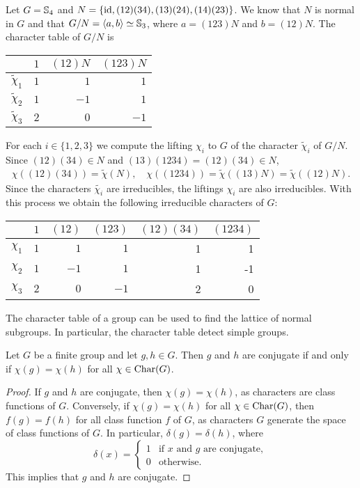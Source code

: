 \begin{example}
    Let $G=\mathbb{S}_4$ and $N=\{\operatorname{id},(12)(34),(13)(24),(14)(23)\}$. We know that $N$ is normal in $G$ 
    and that $G/N=\langle a,b\rangle\simeq\mathbb{S}_3$, where 
    $a=(123)N$ and $b=(12)N$. 
    The character table of $G/N$ is 
    \begin{center}
		\begin{tabular}{|c|rrr|}
			\hline
			& $1$ & $(12)N$ & $(123)N$ \tabularnewline
			\hline 
			$\widetilde{\chi}_{1}$ & $1$ & $1$ & $1$\tabularnewline
			$\widetilde{\chi}_{2}$ & $1$ & $-1$ & $1$ \tabularnewline
			$\widetilde{\chi}_{3}$ & $2$ & $0$ & $-1$ \tabularnewline
			\hline
		\end{tabular}
	\end{center}
    For each $i\in\{1,2,3\}$ we compute the lifting $\chi_i$ to $G$ of the character  
    $\widetilde{\chi}_i$ of $G/N$. 
    Since $(12)(34)\in N$ and $(13)(1234)=(12)(34)\in N$, 
    \begin{align*}
        \chi( (12)(34) )=\widetilde{\chi}(N),\quad
        \chi( (1234) )=\widetilde{\chi}((13)N)=\widetilde{\chi}((12)N).
    \end{align*}
    Since the characters $\widetilde{\chi_i}$ are irreducibles, 
    the liftings $\chi_i$ are also irreducibles. With this process
    we obtain the following irreducible characters of $G$:
    	\begin{center}
		\begin{tabular}{|c|rrrrr|}
			\hline
			& $1$ & $(12)$ & $(123)$ & $(12)(34)$ & $(1234)$ \tabularnewline
			\hline 
			$\chi_{1}$ & $1$ & $1$ & $1$ & 1 & 1\tabularnewline
			$\chi_{2}$ & $1$ & $-1$ & $1$ & 1 & -1 \tabularnewline
			$\chi_{3}$ & $2$ & $0$ & $-1$ & 2 & 0\tabularnewline
			\hline
		\end{tabular}
	\end{center}
\end{example}

The character table of a group can be used to find the lattice 
of normal subgroups. In particular, the character table detect simple groups. 

\begin{lemma}
    Let $G$ be a finite group and 
    let $g,h\in G$. Then $g$ and $h$ 
    are conjugate if and only if 
    $\chi(g)=\chi(h)$ for all
    $\chi\in\operatorname{Char}(G)$. 
\end{lemma}

\begin{proof}
    If $g$ and $h$ are conjugate, then $\chi(g)=\chi(h)$, as characters are class functions
    of $G$.
    Conversely, if $\chi(g)=\chi(h)$ for all $\chi\in\operatorname{Char}(G)$, then 
    $f(g)=f(h)$ for all class function $f$ of $G$, 
    as characters $G$ generate the space of class functions of $G$. In particular, 
    $\delta(g)=\delta(h)$, where
    \[
    \delta(x)=\begin{cases}
    1 & \text{if $x$ and $g$ are conjugate},\\
    0 & \text{otherwise}.
    \end{cases}
    \]
    This implies that $g$ and $h$ are conjugate.
\end{proof}

